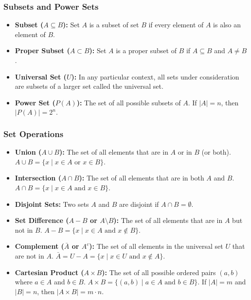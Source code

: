 \documentclass{article}
\begin{document}
\subsubsection{Subsets and Power Sets}
\begin{itemize}
    \item \textbf{Subset ($A \subseteq B$):} Set $A$ is a subset of set $B$ if every element of $A$ is also an element of $B$.
    \item \textbf{Proper Subset ($A \subset B$):} Set $A$ is a proper subset of $B$ if $A \subseteq B$ and $A \neq B$.
    \item \textbf{Universal Set ($U$):} In any particular context, all sets under consideration are subsets of a larger set called the universal set.
    \item \textbf{Power Set ($P(A)$):} The set of all possible subsets of $A$. If $|A| = n$, then $|P(A)| = 2^n$.
\end{itemize}

\subsubsection{Set Operations}
\begin{itemize}
    \item \textbf{Union ($A \cup B$):} The set of all elements that are in $A$ or in $B$ (or both). $A \cup B = \{x \mid x \in A \text{ or } x \in B\}$.
    \item \textbf{Intersection ($A \cap B$):} The set of all elements that are in both $A$ and $B$. $A \cap B = \{x \mid x \in A \text{ and } x \in B\}$.
    \item \textbf{Disjoint Sets:} Two sets $A$ and $B$ are disjoint if $A \cap B = \emptyset$.
    \item \textbf{Set Difference ($A - B$ or $A \setminus B$):} The set of all elements that are in $A$ but not in $B$. $A - B = \{x \mid x \in A \text{ and } x \notin B\}$.
    \item \textbf{Complement ($\bar{A}$ or $A^c$):} The set of all elements in the universal set $U$ that are not in $A$. $\bar{A} = U - A = \{x \mid x \in U \text{ and } x \notin A\}$.
    \item \textbf{Cartesian Product ($A \times B$):} The set of all possible ordered pairs $(a, b)$ where $a \in A$ and $b \in B$. $A \times B = \{(a, b) \mid a \in A \text{ and } b \in B\}$. If $|A|=m$ and $|B|=n$, then $|A \times B|=m \cdot n$.
\end{itemize}
\end{document}

